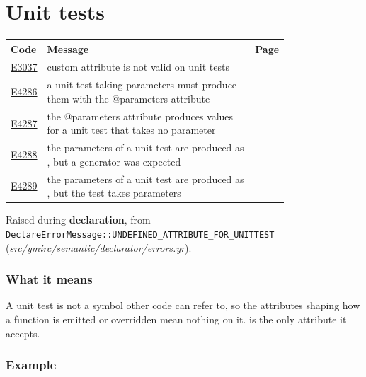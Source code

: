 
\clearpage
\section{Unit tests}
\label{sec:codes:tests}

\begin{longtable}{@{}l p{0.78\linewidth} r@{}}
\toprule Code & Message & Page\\ \midrule \endhead
\hyperref[sec:codes:e3037]{E3037} & custom attribute \errhole{} is not valid on unit tests & \pageref{sec:codes:e3037}\\
\hyperref[sec:codes:e4286]{E4286} & a unit test taking parameters must produce them with the @parameters attribute & \pageref{sec:codes:e4286}\\
\hyperref[sec:codes:e4287]{E4287} & the @parameters attribute produces values for a unit test that takes no parameter & \pageref{sec:codes:e4287}\\
\hyperref[sec:codes:e4288]{E4288} & the parameters of a unit test are produced as \errhole{}, but a generator was expected & \pageref{sec:codes:e4288}\\
\hyperref[sec:codes:e4289]{E4289} & the parameters of a unit test are produced as \errhole{}, but the test takes \errhole{} parameters & \pageref{sec:codes:e4289}\\
\bottomrule
\end{longtable}

\label{sec:codes:e3037}

Raised during \textbf{declaration}, from \texttt{DeclareErrorMessage::\allowbreak{}UNDEFINED\_\allowbreak{}ATTRIBUTE\_\allowbreak{}FOR\_\allowbreak{}UNITTEST} (\textit{src/\allowbreak{}ymirc/\allowbreak{}semantic/\allowbreak{}declarator/\allowbreak{}errors.yr}).

\subsubsection*{What it means}

A unit test is not a symbol other code can refer to, so the attributes shaping how a function is emitted or overridden mean nothing on it.  is the only attribute it accepts.

\subsubsection*{Example}

